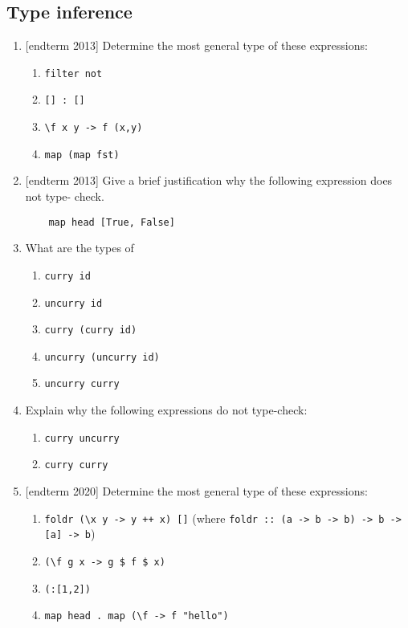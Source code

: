 \documentclass{article}
\def\code#1{\texttt{#1}}
\begin{document}
\subsection{Type inference}
\begin{enumerate}
    \item {[endterm 2013]} Determine the most general type of these expressions:
        \begin{enumerate}
            \item \code{filter not}
            \item \code{[] : []}
            \item \code{\textbackslash f x y -> f (x,y)}
            \item \code{map (map fst)}
        \end{enumerate}

    \item {[endterm 2013]} Give a brief justification why the following expression does not type- check.
        \begin{verbatim}
    map head [True, False]
        \end{verbatim}

    \item \cite[p. 319]{thompson} What are the types of
        \begin{enumerate}
            \item \code{curry id}
            \item \code{uncurry id}
            \item \code{curry (curry id)}
            \item \code{uncurry (uncurry id)}
            \item \code{uncurry curry}
        \end{enumerate}

    \item \cite[p. 319]{thompson} Explain why the following expressions do not type-check:
        \begin{enumerate}
            \item \code{curry uncurry}
            \item \code{curry curry}
        \end{enumerate}

    \item {[endterm 2020]} Determine the most general type of these expressions:
        \begin{enumerate}
            \item \code{foldr (\textbackslash x y -> y ++ x) []} (where \code{foldr :: (a -> b -> b) -> b -> [a] -> b})
            \item \code{(\textbackslash f g x -> g \$ f \$ x)}
            \item \code{(:[1,2])}
            \item \code{map head . map (\textbackslash f -> f "hello")}
        \end{enumerate}
\end{enumerate}

\printbibliography
\end{document}
